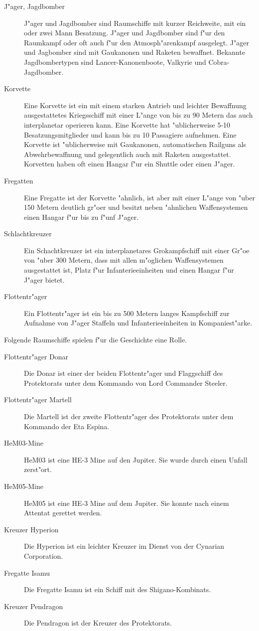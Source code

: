 \begin{description}
\item [J"ager, Jagdbomber] J"ager und Jagdbomber sind Raumschiffe mit kurzer Reichweite, mit ein oder zwei Mann Besatzung.
      J"ager und Jagdbomber sind f"ur den Raumkampf oder oft auch f"ur den Atmosph"arenkampf ausgelegt. J"ager und Jagbomber sind mit Gau\3kanonen und Raketen bewaffnet. Bekannte Jagdbombertypen sind Lancer-Kanonenboote, Valkyrie und Cobra-Jagdbomber.
\item [Korvette] Eine Korvette ist ein mit einem starken Antrieb und leichter Bewaffnung ausgestattetes Kriegsschiff
      mit einer L"ange von bis zu 90 Metern das auch interplanetar operieren kann. Eine Korvette hat "ublicherweise 5-10 Besatzungsmitglieder und kann bis zu 10 Passagiere aufnehmen. Eine Korvette ist "ublicherweise mit Gau\3kanonen, automatischen Railguns als Abwehrbewaffnung und gelegentlich auch mit Raketen ausgestattet. Korvetten haben oft einen Hangar f"ur ein Shuttle oder einen J"ager.
\item [Fregatten] Eine Fregatte ist der Korvette "ahnlich, ist aber mit einer L"ange von "uber 150 Metern deutlich gr"o\3er und besitzt
      neben "ahnlichen Waffensystemen einen Hangar f"ur bis zu f"unf J"ager.
\item [Schlachtkreuzer] Ein Schachtkreuzer ist ein interplanetares Gro\3kampfschiff mit einer Gr"o\3e von "uber 300 Metern,
      dass mit allen m"oglichen Waffensystemen ausgestattet ist, Platz f"ur Infanterieeinheiten und einen Hangar f"ur J"ager bietet.
\item [Flottentr"ager] Ein Flottentr"ager ist ein bis zu 500 Metern langes Kampfschiff zur Aufnahme von J"ager Staffeln und 
      Infanterieeinheiten in Kompaniest"arke.
\end{description}

Folgende Raumschiffe spielen f"ur die Geschichte eine Rolle.

\begin{description}
\item [Flottentr"ager Donar] Die Donar ist einer der beiden Flottentr"ager und Flaggschiff des Protektorats unter
      dem Kommando von Lord Commander Steeler.
\item [Flottentr"ager Martell] Die Martell ist der zweite Flottentr"ager des Protektorats unter dem Kommando der Eta Espina.
\item [HeM03-Mine] HeM03 ist eine HE-3 Mine auf den Jupiter. Sie wurde durch einen Unfall zerst"ort.
\item [HeM05-Mine] HeM05 ist eine HE-3 Mine auf dem Jupiter. Sie konnte nach einem Attentat gerettet werden.
\item [Kreuzer Hyperion] Die Hyperion ist ein leichter Kreuzer im Dienst von der Cynarian Corporation.
\item [Fregatte Isamu] Die Fregatte Isamu ist ein Schiff mit des Shigano-Kombinats.
\item [Kreuzer Pendragon] Die Pendragon ist der Kreuzer des Protektorats.
\end{description}

